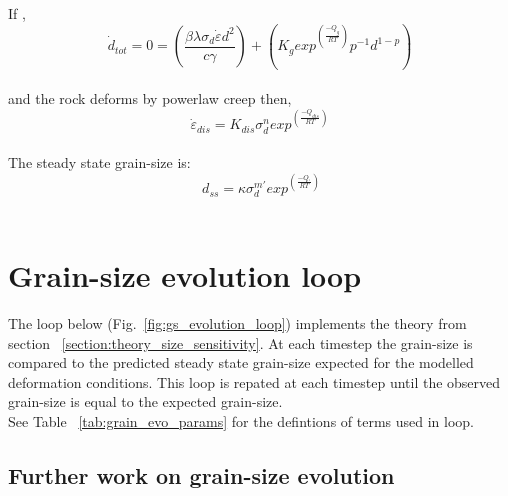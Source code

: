 \documentclass[]{scrreprt}
\begin{document}
If , \: 
\begin{equation}
 \label{eq:d_tot_0}
\dot{d}_{tot} = 0 = \left(\frac{\beta\lambda\sigma_{d}\dot{\varepsilon}d^2}{c\gamma}\right) + \left(K_g exp^{\left(\frac{-Q_g}{RT}\right)} p^{-1} d^{1-p}\right)
\end{equation}\\

and the rock deforms by powerlaw creep then, \:
\begin{equation}
 \label{eq:dislocation_creep}
\dot{\varepsilon}_{dis} = K_{dis} \sigma_d^n exp^{\left(\frac{-Q_{dis}}{RT}\right)}
\end{equation}\\

The steady state grain-size is: \:
\begin{equation}
 \label{eq:steady_state_gs}
\ d_{ss} = \kappa \sigma_d^{m'} exp^{\left(\frac{-Q_{'}}{RT}\right)}
\end{equation}\\


\section{Grain-size evolution loop}
\label{section:gs_evolution_loop}
The loop below (Fig.~\ref{fig:gs_evolution_loop}) implements the theory from section ~\ref{section:theory_size_sensitivity}. At each timestep the grain-size is compared to the predicted steady state grain-size expected for the modelled deformation conditions. This loop is repated at each timestep until the observed grain-size is equal to the expected grain-size.\\

See Table ~\ref{tab:grain_evo_params} for the defintions of terms used in loop.\\


\subsection{Further work on grain-size evolution}
\label{subsection:further_work}
\end{document}
